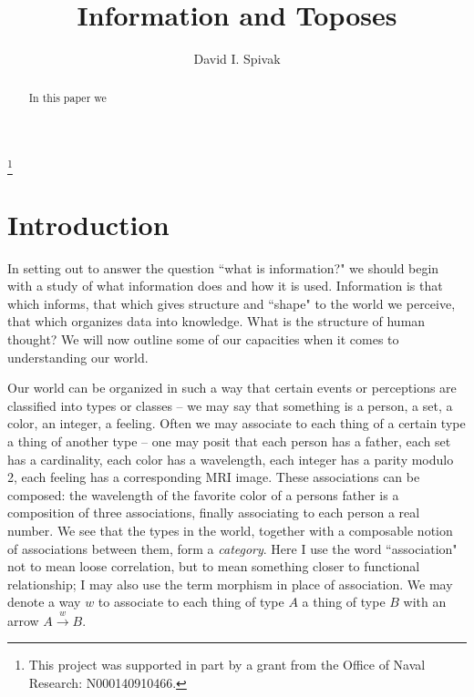 \documentclass{amsart}
\newcommand{\To}[1]{\xrightarrow{#1}}
\theoremstyle{remark}
\theoremstyle{definition}
\begin{document}
\title{Information and Toposes}

\author{David I. Spivak}

\thanks{This project was supported in part by a grant from the Office of Naval Research: N000140910466.}

\maketitle

\begin{abstract}

In this paper we 

\end{abstract}

\tableofcontents

\section{Introduction}

In setting out to answer the question ``what is information?" we should begin with a study of what information does and how it is used.  Information is that which informs, that which gives structure and ``shape" to the world we perceive, that which organizes data into knowledge.  What is the structure of human thought?  We will now outline some of our capacities when it comes to understanding our world.

Our world can be organized in such a way that certain events or perceptions are classified into types or classes -- we may say that something is a person, a set, a color, an integer, a feeling.  Often we may associate to each thing of a certain type a thing of another type -- one may posit that each person has a father, each set has a cardinality, each color has a wavelength, each integer has a parity modulo 2, each feeling has a corresponding MRI image.  These associations can be composed: the wavelength of the favorite color of a persons father is a composition of three associations, finally associating to each person a real number.  We see that the types in the world, together with a composable notion of associations between them, form a {\em category}.  Here I use the word ``association" not to mean loose correlation, but to mean something closer to functional relationship; I may also use the term morphism in place of association.  We may denote a way $w$ to associate to each thing of type $A$ a thing of type $B$ with an arrow $A\To{w} B$.
\end{document}
